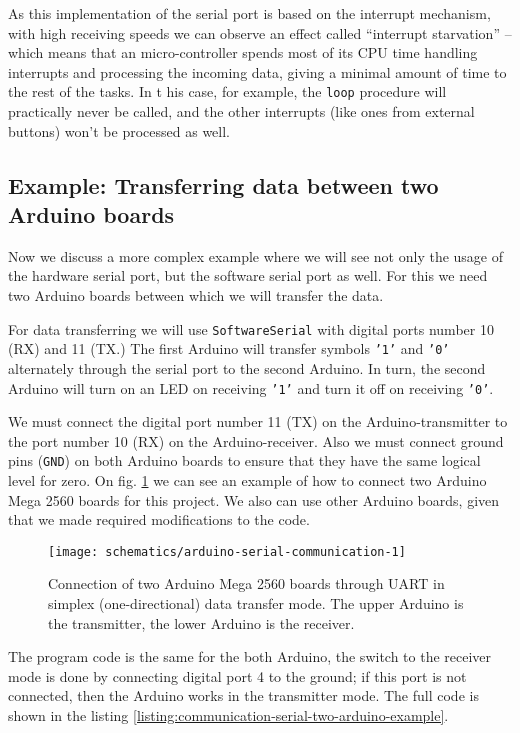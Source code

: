 \documentclass[../sparc.tex]{subfiles}
\begin{document}
As this implementation of the serial port is based on the interrupt mechanism,
with high receiving speeds we can observe an effect called ``interrupt
starvation'' -- which means that an micro-controller spends most of its CPU time
handling interrupts and processing the incoming data, giving a minimal amount of
time to the rest of the tasks.  In t his case, for example, the \texttt{loop}
procedure will practically never be called, and the other interrupts (like ones
from external buttons) won't be processed as well.

\subsection{Example: Transferring data between two Arduino boards}

Now we discuss a more complex example where we will see not only the usage of
the hardware serial port, but the software serial port as well.  For this we
need two Arduino boards between which we will transfer the data.

For data transferring we will use \texttt{SoftwareSerial} with digital ports
number 10 (RX) and 11 (TX.)  The first Arduino will transfer symbols
\texttt{'1'} and \texttt{'0'} alternately through the serial port to the second
Arduino.  In turn, the second Arduino will turn on an LED on receiving
\texttt{'1'} and turn it off on receiving \texttt{'0'}.

We must connect the digital port number 11 (TX) on the Arduino-transmitter to
the port number 10 (RX) on the Arduino-receiver.  Also we must connect ground
pins (\texttt{GND}) on both Arduino boards to ensure that they have the same
logical level for zero.  On fig. \ref{fig:arduino-serial-communication-1} we can
see an example of how to connect two Arduino Mega 2560 boards for this project.
We also can use other Arduino boards, given that we made required modifications
to the code.

\begin{figure}[H]
  \centering
  \texttt{[image: schematics/arduino-serial-communication-1]}
  \caption{Connection of two Arduino Mega 2560 boards through UART in simplex
    (one-directional) data transfer mode.  The upper Arduino is the transmitter,
    the lower Arduino is the receiver.}
  \label{fig:arduino-serial-communication-1}
\end{figure}

The program code is the same for the both Arduino, the switch to the receiver
mode is done by connecting digital port 4 to the ground; if this port is not
connected, then the Arduino works in the transmitter mode. The full code is
shown in the listing \ref{listing:communication-serial-two-arduino-example}.
\end{document}
